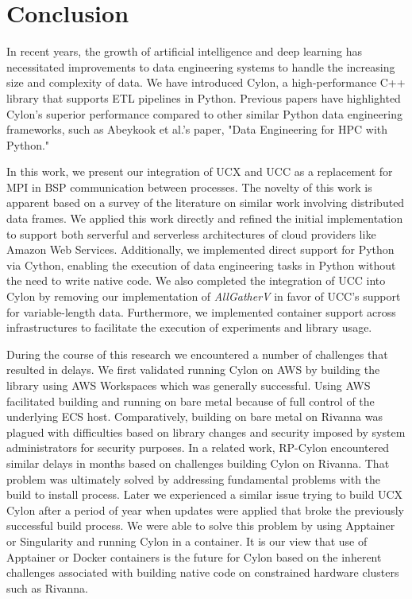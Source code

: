 \section{Conclusion}
\label{sec:conclusion}
In recent years, the growth of artificial intelligence and deep learning has necessitated improvements to data engineering systems to handle the increasing size and complexity of data. We have introduced Cylon, a high-performance C++ library that supports ETL pipelines in Python. Previous papers have highlighted Cylon's superior performance compared to other similar Python data engineering frameworks, such as Abeykook et al.'s paper, "Data Engineering for HPC with Python."  

In this work, we present our integration of UCX and UCC as a replacement for MPI in BSP communication between processes. The novelty of this work is apparent based on a survey of the literature on similar work involving distributed data frames. We applied this work directly and refined the initial implementation to support both serverful and serverless architectures of cloud providers like Amazon Web Services. Additionally, we implemented direct support for Python via Cython, enabling the execution of data engineering tasks in Python without the need to write native code. We also completed the integration of UCC into Cylon by removing our implementation of \textit{AllGatherV} in favor of UCC's support for variable-length data. Furthermore, we implemented container support across infrastructures to facilitate the execution of experiments and library usage.

During the course of this research we encountered a number of challenges that resulted in delays.  We first validated running Cylon on AWS by building the library using AWS Workspaces which was generally successful.   Using AWS facilitated building and running on bare metal because of full control of the underlying ECS host.  Comparatively, building on bare metal on Rivanna was plagued with difficulties based on library changes and security imposed by system administrators for security purposes.  In a related work, RP-Cylon encountered similar delays in months based on challenges building Cylon on Rivanna.  That problem was ultimately solved by addressing fundamental problems with the build to install process.  Later we experienced a similar issue trying to build UCX Cylon after a period of year when updates were applied that broke the previously successful build process.  We were able to solve this problem by using Apptainer or Singularity and running Cylon in a container.  It is our view that use of Apptainer or Docker containers is the future for Cylon based on the inherent challenges associated with building native code on constrained hardware clusters such as Rivanna.

